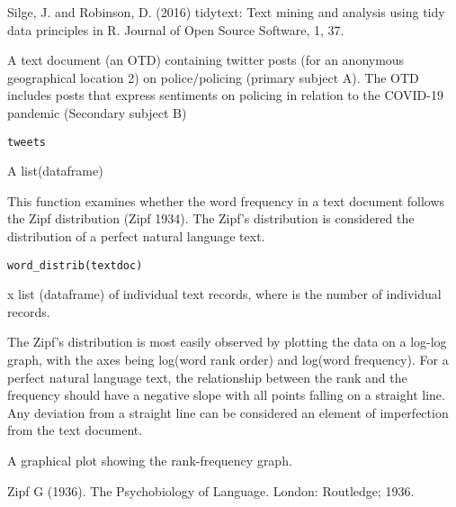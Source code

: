 \documentclass[a4paper]{book}
\begin{document}
%
\begin{References}\relax
Silge, J. and Robinson, D. (2016) tidytext:
Text mining and analysis using tidy data principles in R.
Journal of Open Source Software, 1, 37.
\end{References}
%
\begin{Description}\relax
A text document (an OTD) containing twitter posts
(for an anonymous geographical location 2) on police/policing
(primary subject A). The OTD includes
posts that express sentiments on policing in relation to
the COVID-19 pandemic (Secondary subject B)
\end{Description}
%
\begin{Usage}
\begin{verbatim}
tweets
\end{verbatim}
\end{Usage}
%
\begin{Format}
A list(dataframe)
\end{Format}
%
\begin{Description}\relax
This function examines whether the word
frequency in a text document follows the Zipf distribution
(Zipf 1934). The Zipf's distribution is considered the
distribution of a perfect natural language text.
\end{Description}
%
\begin{Usage}
\begin{verbatim}
word_distrib(textdoc)
\end{verbatim}
\end{Usage}
%
\begin{Arguments}
\begin{ldescription}
\item[\code{textdoc}]  x  list (dataframe)
of individual text records, where  is the number
of individual records.
\end{ldescription}
\end{Arguments}
%
\begin{Details}\relax
The Zipf's distribution is most easily observed by
plotting the data on a log-log graph, with the axes being
log(word rank order) and log(word frequency). For a perfect
natural language text, the relationship between the rank and
the frequency should have a negative slope with all points
falling on a straight line. Any deviation from a straight
line can be considered an element of imperfection from the
text document.
\end{Details}
%
\begin{Value}
A graphical plot showing the rank-frequency graph.
\end{Value}
%
\begin{References}\relax
Zipf G (1936). The Psychobiology of Language.
London: Routledge; 1936.
\end{References}
\printindex{}
\end{document}
